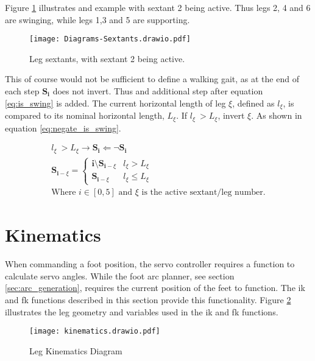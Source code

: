     \noindent
    Figure \ref{fig:sextants} illustrates and example with sextant 2 being active. Thus legs 2, 4 and 6 are swinging, while legs 1,3 and 5 are supporting.
    \begin{figure}[h]
        \centering
        \hspace{1.1cm}
        \texttt{[image: Diagrams-Sextants.drawio.pdf]}
        \caption{Leg sextants, with sextant 2 being active.} 
        \label{fig:sextants}
    \end{figure}

    This of course would not be sufficient to define a walking gait, as at the end of each step \(\boldsymbol{S_i}\) does not invert.
    Thus and additional step after equation \ref{eq:is_swing} is added. The current horizontal length of leg \(\xi\), defined as \(l_\xi\), is compared to its nominal
    horizontal length, \(L_\xi\). If \(l_\xi\ > L_\xi\), invert \(\xi\). As shown in equation \ref{eq:negate_is_swing}.

    \begin{equation} \label{eq:negate_is_swing}
        \begin{gathered}
            l_\xi\ > L_\xi \longrightarrow \boldsymbol{S_i} \Longleftarrow  \lnot \boldsymbol{S_i} \\
            \boldsymbol{S}_{\boldsymbol{i} - \xi} =
                                                \begin{cases}
                                                    \boldsymbol{i} \setminus \boldsymbol{S}_{\boldsymbol{i} - \xi} & l_\xi > L_\xi \\
                                                    \boldsymbol{S}_{\boldsymbol{i} - \xi} & l_\xi \leq L_\xi
                                                \end{cases}\\
            \text{Where \(i \in [0,5]\) and \(\xi\) is the active sextant/leg number.}
        \end{gathered}
    \end{equation}

\newpage
\section{Kinematics}
    When commanding a foot position, the servo controller requires a function to calculate servo angles. While the foot arc planner, see section 
    \ref{sec:arc_generation}, requires the current position of the feet to function. The \ac{ik} and \ac{fk} functions described in this section provide
    this functionality. Figure \ref{fig:kinematics} illustrates the leg geometry and variables used in the \ac{ik} and \ac{fk} functions.
    \begin{figure}[h]
        \centering
        \texttt{[image: kinematics.drawio.pdf]}
        \caption{Leg Kinematics Diagram}
        \label{fig:kinematics}
    \end{figure}

